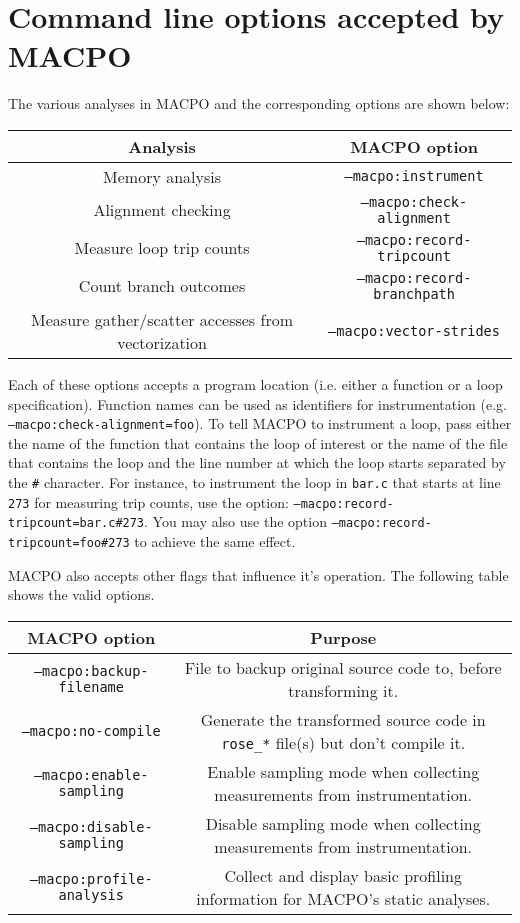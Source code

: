 \section{Command line options accepted by MACPO}

The various analyses in MACPO and the corresponding options are shown below:

\begin{tabular}[h]{|c|c|}\hline
\textbf{Analysis} & \textbf{MACPO option} \\\hline
Memory analysis & \texttt{--macpo:instrument} \\\hline
Alignment checking & \texttt{--macpo:check-alignment} \\\hline
Measure loop trip counts & \texttt{--macpo:record-tripcount} \\\hline
Count branch outcomes & \texttt{--macpo:record-branchpath} \\\hline
Measure gather/scatter accesses from vectorization & \texttt{--macpo:vector-strides} \\\hline
\end{tabular}

Each of these options accepts a program location (i.e. either a function or a loop specification). Function names can be used as identifiers for instrumentation (e.g. \texttt{--macpo:check-alignment=foo}). To tell MACPO to instrument a loop, pass either the name of the function that contains the loop of interest or the name of the file that contains the loop and the line number at which the loop starts separated by the \texttt{\#} character. For instance, to instrument the loop in \texttt{bar.c} that starts at line \texttt{273} for measuring trip counts, use the option: \texttt{--macpo:record-tripcount=bar.c\#273}. You may also use the option \texttt{--macpo:record-tripcount=foo\#273} to achieve the same effect.

MACPO also accepts other flags that influence it's operation. The following table shows the valid options.
\begin{tabular}[h]{|c|c|}\hline
\textbf{MACPO option} & \textbf{Purpose} \\\hline
\texttt{--macpo:backup-filename} & File to backup original source code to, before transforming it.\\\hline
\texttt{--macpo:no-compile} & Generate the transformed source code in \texttt{rose\_*} file(s) but don't compile it.\\\hline
\texttt{--macpo:enable-sampling} & Enable sampling mode when collecting measurements from instrumentation.\\\hline
\texttt{--macpo:disable-sampling} & Disable sampling mode when collecting measurements from instrumentation.\\\hline
\texttt{--macpo:profile-analysis} & Collect and display basic profiling information for MACPO's static analyses.\\\hline
\end{tabular}

